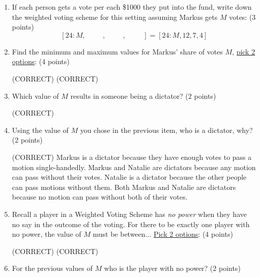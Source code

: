\documentclass[12pt]{exam}
\begin{document}
\begin{enumerate}
\begin{enumerate}
\item \label{firstQnSec2} If each person gets a vote per each \$1000 they put into the fund, write down the weighted voting scheme for this setting assuming Markus gets $M$ votes: (3 points)\vspace{1em}
$$[24:M,\hspace{1cm},\hspace{1cm},\hspace{1cm}]=[24:M,12,7,4]$$
\vfill
\newpage
\item Find the minimum and maximum values for Markus' share of votes $M$, \underline{pick 2 options}: (4 points)
\begin{checkboxes}
    (CORRECT)
    (CORRECT)
\end{checkboxes}
\vfill
\item Which value of $M$ results in someone being a dictator? (2 points)
\begin{checkboxes}
    (CORRECT)
\end{checkboxes}
\vfill
\item Using the value of $M$ you chose in the previous item, who is a dictator, why? (2 points)
\begin{checkboxes}
    \choice (CORRECT) Markus is a dictator because they have enough votes to pass a motion single-handedly.
    \choice Markus and Natalie are dictators because any motion can pass without their votes.
    \choice Natalie is a dictator because the other people can pass motions without them.
    \choice Both Markus and Natalie are dictators because no motion can pass without both of their votes.
\end{checkboxes}
\vfill
\item Recall a player in a Weighted Voting Scheme has \emph{no power} when they have no say in the outcome of the voting. For there to be exactly one player with no power, the value of $M$ must be between... \underline{Pick 2 options}: (4 points)
\begin{checkboxes}
     (CORRECT)
     (CORRECT)
\end{checkboxes}
\vfill
\newpage
\item For the previous values of $M$ who is the player with no power? (2 points)
\begin{checkboxes}

\end{checkboxes}
\end{enumerate}
\end{enumerate}
\end{document}
